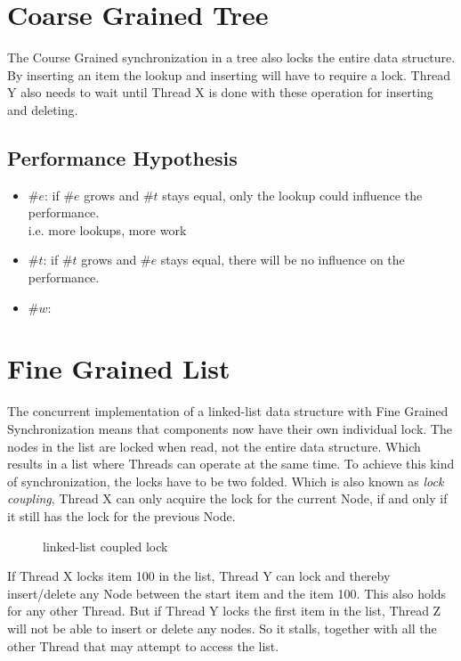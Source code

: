 \documentclass[10pt,a4paper]{article}
\begin{document}
\section{Coarse Grained Tree}
The Course Grained synchronization in a tree also locks the entire
data structure. By inserting an item the lookup and inserting will have to
require a lock. Thread Y also needs to wait until
Thread X is done with these operation for inserting and deleting.

\subsection{Performance Hypothesis}
\begin{itemize}
 \item $\#e$:   if $\#e$ grows and $\#t$ stays equal, only the lookup could influence the
 performance. \\ i.e. more lookups, more work
 \item $\#t$:   if $\#t$ grows and $\#e$ stays equal, there will be no influence on the performance.
 \item $\#w$:   
\end{itemize}

\section{Fine Grained List}
The concurrent implementation of a linked-list data structure with Fine Grained
Synchronization means that components now have their own individual lock. The
nodes in the list are locked when read, not the entire data structure. Which
results in a list where Threads can operate at the same time. To achieve this
kind of synchronization, the locks have to be two folded. Which is also known 
as \emph{lock coupling}, Thread X can only acquire the lock for the current 
Node, if and only if it still has the lock for the previous Node.
\begin{figure}[h]
\centerline{
}
\caption{linked-list coupled lock}
\end{figure}
If Thread X locks item 100 in the list, Thread Y can lock and thereby
insert/delete any Node between the start item and the item 100. This
also holds for any other Thread. But if Thread Y locks the first item in the
list, Thread Z will not be able to insert or delete any nodes. So it stalls,
together with all the other Thread that may attempt to access the list.
\end{document}
